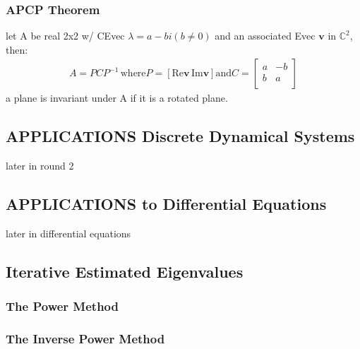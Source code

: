 \documentclass[12pt]{article}
\newcommand{\C}{\mathbb{C}}
\begin{document}
    \subsubsection{APCP Theorem}
        let A be real 2x2 w/ CEvec $\lambda = a-bi(b\ne 0)$  and
        an associated Evec $\bm{v}$  in $\C^2$, then:  
        \begin{align*}
            A=PCP^{-1}\,  \text{where} P = 
            [\text{Re}\bm{v}\,\text{Im}\bm{v}] \text{and}
            C= \begin{bmatrix}
            a&-b\\
            b&a\\
            \end{bmatrix}
        \end{align*}
        a plane is invariant under A if it is a rotated plane.
\subsection{APPLICATIONS Discrete Dynamical Systems}
    later in round 2
\subsection{APPLICATIONS to Differential Equations}
    later in differential equations
\subsection{Iterative Estimated Eigenvalues}
    \subsubsection{The Power Method}
    \subsubsection{The Inverse Power Method}
        
\end{document}
